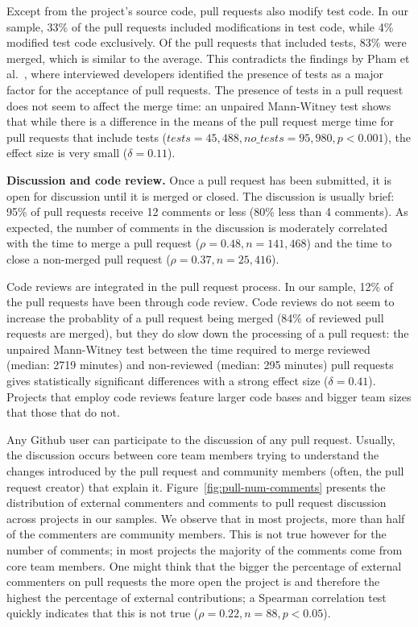 \documentclass{sig-alternate}
\begin{document}
Except from the project's source code, pull requests also modify test code. In
our sample, 33\% of the pull requests included modifications in test code, while
4\% modified test code exclusively. Of the pull requests that included tests,
83\% were merged, which is similar to the average.  This contradicts the
findings by Pham et al.~\cite{Pham13}, where interviewed developers identified
the presence of tests as a major factor for the acceptance of pull requests.
The presence of tests in a pull request does not seem to affect the merge time:
an unpaired Mann-Witney test shows that while there is a difference in the means
of the pull request merge time for pull requests that include tests ($tests =
45,488, no\_tests = 95,980, p < 0.001$), the effect size is very small ($\delta =
0.11$).


\textbf{Discussion and code review.}
Once a pull request has been submitted, it is open for discussion until it is
merged or closed. The discussion is usually brief: 95\% of pull requests receive
12 comments or less (80\% less than 4 comments). As expected, the number of
comments in the discussion is moderately correlated with the time to merge a
pull request ($\rho = 0.48, n = 141,468$) and the time to close a non-merged
pull request ($\rho = 0.37, n = 25,416$).

Code reviews are integrated in the pull request process. In our sample, 12\% of
the pull requests have been through code review. Code reviews do not seem to
increase the probablity of a pull request being merged (84\% of reviewed pull
requests are merged), but they do slow down the processing of a pull request:
the unpaired Mann-Witney test between the time required to merge reviewed
(median: 2719 minutes) and non-reviewed (median: 295 minutes) pull requests
gives statistically significant differences with a strong effect size ($\delta =
0.41$). Projects that employ code reviews feature larger code bases and 
bigger team sizes that those that do not.

Any Github user can participate to the discussion of any pull request. Usually,
the discussion occurs between core team members trying to understand the changes
introduced by the pull request and community members (often, the pull
request creator) that explain it. Figure~\ref{fig:pull-num-comments} presents
the distribution of external commenters and comments to pull request discussion
across projects in our samples. We observe that in most projects, more than half
of the commenters are community members. This is not true however for the number
of comments; in most projects the majority of the comments come from core team
members. One might think that the bigger the percentage of external commenters
on pull requests the more open the project is and therefore the highest the
percentage of external contributions; a Spearman correlation test quickly
indicates that this is not true ($\rho = 0.22, n = 88, p < 0.05$).
\end{document}
